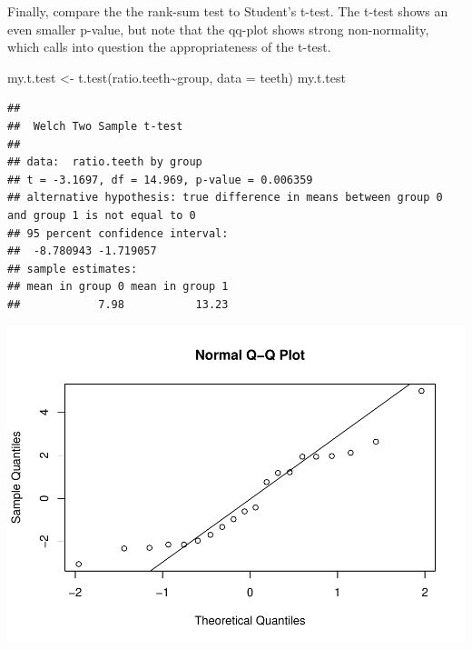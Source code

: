 \documentclass[
]{book}
\newenvironment{Shaded}{\begin{snugshade}}{\end{snugshade}}
\newcommand{\AttributeTok}[1]{\textcolor[rgb]{0.77,0.63,0.00}{#1}}
\newcommand{\DecValTok}[1]{\textcolor[rgb]{0.00,0.00,0.81}{#1}}
\newcommand{\FunctionTok}[1]{\textcolor[rgb]{0.00,0.00,0.00}{#1}}
\newcommand{\NormalTok}[1]{#1}
\newcommand{\OtherTok}[1]{\textcolor[rgb]{0.56,0.35,0.01}{#1}}
\newcommand{\SpecialCharTok}[1]{\textcolor[rgb]{0.00,0.00,0.00}{#1}}
\begin{document}
Finally, compare the the rank-sum test to Student's t-test. The t-test shows an even smaller p-value, but note that the qq-plot shows strong non-normality, which calls into question the appropriateness of the t-test.

\begin{Shaded}
\begin{Highlighting}[]
\NormalTok{my.t.test }\OtherTok{\textless{}{-}} \FunctionTok{t.test}\NormalTok{(ratio.teeth}\SpecialCharTok{\textasciitilde{}}\NormalTok{group, }\AttributeTok{data =}\NormalTok{ teeth)}
\NormalTok{my.t.test}
\end{Highlighting}
\end{Shaded}

\begin{verbatim}
## 
##  Welch Two Sample t-test
## 
## data:  ratio.teeth by group
## t = -3.1697, df = 14.969, p-value = 0.006359
## alternative hypothesis: true difference in means between group 0 and group 1 is not equal to 0
## 95 percent confidence interval:
##  -8.780943 -1.719057
## sample estimates:
## mean in group 0 mean in group 1 
##            7.98           13.23
\end{verbatim}

\begin{Shaded}
\end{Shaded}

\includegraphics{04-Non-Normal-Responses_files/figure-latex/unnamed-chunk-10-1.pdf}
\end{document}
